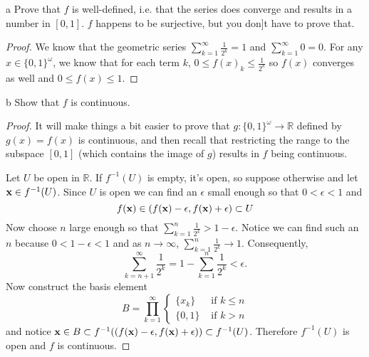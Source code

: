 \documentclass[11pt]{article}
\begin{document}
\begin{p}{a} Prove that $f$ is well-defined, i.e.
that the series does converge and results in a number in $[0,1]$. $f$ happens to
be surjective, but you don]t have to prove that.
\end{p}

\begin{proof}
  We know that the geometric series $\sum_{k=1}^\infty \frac{1}{2^k} = 1$ and
  $\sum_{k=1}^\infty 0 = 0$. For any $x \in \{0, 1\}^\omega$, we know that for
  each term $k$, $0 \leq f(x)_k \leq \frac{1}{2^k}$ so $f(x)$ converges as well and
  $0 \leq f(x) \leq 1$.
\end{proof}

\begin{p}{b} Show that $f$ is continuous.
\end{p}

\begin{proof}
  It will make things a bit easier to prove that $g: \{0, 1\}^\omega \to
  \mathbb{R}$ defined by $g(x) = f(x)$ is continuous, and then recall that
  restricting the range to the subspace $[0, 1]$ (which contains the image of
  $g$) results in $f$ being continuous.

  Let $U$ be open in $\mathbb{R}$. If $f^{-1}(U)$ is empty, it's open, so suppose
  otherwise and let $\vb x \in f^{-1}(U)$. Since $U$ is open we can find an
  $\epsilon$ small enough so that $0 < \epsilon < 1$ and
  \[ f(\vb x) \in (f(\vb x) - \epsilon, f(\vb x) + \epsilon) \subset U \]
  Now choose $n$ large enough so that $\sum_{k=1}^n \frac{1}{2^k} > 1 - \epsilon$. Notice
  we can find such an $n$ because $0 < 1 - \epsilon < 1$ and as $n \to \infty$,
  $\sum_{k=1}^n \frac{1}{2^k} \to 1$. Consequently,
  \[ \sum_{k = n + 1}^\infty \frac{1}{2^k}
    = 1 - \sum_{k=1}^n \frac{1}{2^k} < \epsilon.
  \]
  Now construct the basis element
  \[ B = \prod_{k=1}^\infty
    \begin{cases}
      \{x_k\} &\text{ if } k \leq n \\
      \{0, 1\} &\text{ if } k > n
    \end{cases}
  \]
  and notice $\vb x \in B \subset f^{-1}\qty((f(\vb x) - \epsilon, f(\vb x) +
  \epsilon)) \subset f^{-1}(U)$. Therefore $f^{-1}(U)$ is open and $f$ is
  continuous.
\end{proof}
\end{document}

